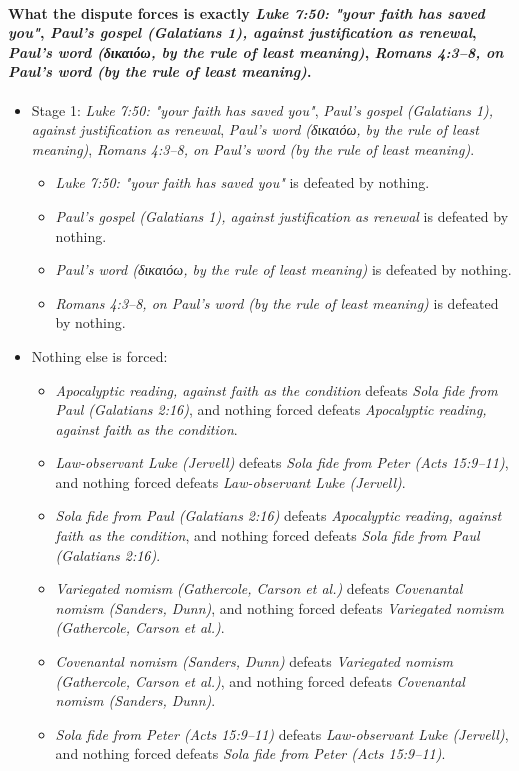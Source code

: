 \documentclass[11pt]{article}
\begin{document}
\paragraph{What the dispute forces is exactly \emph{Luke 7:50: "your faith has saved you"}, \emph{Paul's gospel (Galatians 1), against justification as renewal}, \emph{Paul's word (δικαιόω, by the rule of least meaning)}, \emph{Romans 4:3–8, on Paul's word (by the rule of least meaning)}.}
\begin{itemize}
\item Stage 1: \emph{Luke 7:50: "your faith has saved you"}, \emph{Paul's gospel (Galatians 1), against justification as renewal}, \emph{Paul's word (δικαιόω, by the rule of least meaning)}, \emph{Romans 4:3–8, on Paul's word (by the rule of least meaning)}.
\begin{itemize}
\item \emph{Luke 7:50: "your faith has saved you"} is defeated by nothing.
\item \emph{Paul's gospel (Galatians 1), against justification as renewal} is defeated by nothing.
\item \emph{Paul's word (δικαιόω, by the rule of least meaning)} is defeated by nothing.
\item \emph{Romans 4:3–8, on Paul's word (by the rule of least meaning)} is defeated by nothing.
\end{itemize}
\item Nothing else is forced:
\begin{itemize}
\item \emph{Apocalyptic reading, against faith as the condition} defeats \emph{Sola fide from Paul (Galatians 2:16)}, and nothing forced defeats \emph{Apocalyptic reading, against faith as the condition}.
\item \emph{Law-observant Luke (Jervell)} defeats \emph{Sola fide from Peter (Acts 15:9–11)}, and nothing forced defeats \emph{Law-observant Luke (Jervell)}.
\item \emph{Sola fide from Paul (Galatians 2:16)} defeats \emph{Apocalyptic reading, against faith as the condition}, and nothing forced defeats \emph{Sola fide from Paul (Galatians 2:16)}.
\item \emph{Variegated nomism (Gathercole, Carson et al.)} defeats \emph{Covenantal nomism (Sanders, Dunn)}, and nothing forced defeats \emph{Variegated nomism (Gathercole, Carson et al.)}.
\item \emph{Covenantal nomism (Sanders, Dunn)} defeats \emph{Variegated nomism (Gathercole, Carson et al.)}, and nothing forced defeats \emph{Covenantal nomism (Sanders, Dunn)}.
\item \emph{Sola fide from Peter (Acts 15:9–11)} defeats \emph{Law-observant Luke (Jervell)}, and nothing forced defeats \emph{Sola fide from Peter (Acts 15:9–11)}.
\end{itemize}
\end{itemize}
\end{document}
